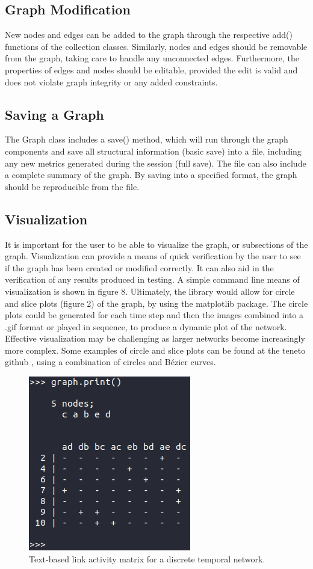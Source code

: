 \begin{design}
\subsection{Graph Modification}
New nodes and edges can be added to the graph through the respective add() functions of the collection classes. Similarly, nodes and edges should be removable from the graph, taking care to handle any unconnected edges. Furthermore, the properties of edges and nodes should be editable, provided the edit is valid and does not violate graph integrity or any added constraints. 
\subsection{Saving a Graph}
The Graph class includes a save() method, which will run through the graph components and save all structural information (basic save) into a file, including any new metrics generated during the session (full save). The file can also include a complete summary of the graph. By saving into a specified format, the graph should be reproducible from the file.
\subsection{Visualization}
It is important for the user to be able to visualize the graph, or subsections of the graph. Visualization can provide a means of quick verification by the user to see if the graph has been created or modified correctly. It can also aid in the verification of any results produced in testing. A simple command line means of visualization is shown in figure 8. Ultimately, the library would allow for circle \cite{circle_plot} and slice plots (figure 2) of the graph, by using the matplotlib package. The circle plots could be generated for each time step and then the images combined into a .gif format or played in sequence, to produce a dynamic plot of the network. Effective visualization may be challenging as larger networks become increasingly more complex. Some examples of circle and slice plots can be found at the teneto github \cite{teneto}, using a combination of circles and Bézier curves.
\clearpage
\begin{figure}[t]
    \centering
    \includegraphics[scale=0.7]{images/graph_print.PNG}
    \caption{Text-based link activity matrix for a discrete temporal network.}
\end{figure}

\end{design}
